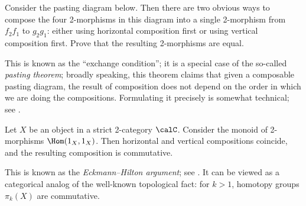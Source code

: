 \begin{exercise}\label{ec:exchange_condition}
  Consider the pasting diagram below. Then there are two obvious ways to
  compose the four 2-morphisms in this diagram into a single 2-morphism from
  $f_2f_1$ to $g_2g_1$: either using horizontal composition first or using
  vertical composition first. Prove that the resulting 2-morphisms are equal.

  \begin{figure}[h]
  \end{figure}
  This is known as the ``exchange condition''; it is a special case of the
  so-called \emph{pasting theorem}; broadly speaking, this theorem claims that given a
  composable pasting diagram, the result of composition does not depend on the order
  in which we are doing the compositions. Formulating it precisely is somewhat
  technical; see \cite{power-pasting}.
\end{exercise}
\begin{lemma}\label{l:eckmann-hilton}
  Let $X$ be an object in a strict 2-category $\calC$. Consider the monoid of
  2-morphisms $\Hom(1_X, 1_X)$. Then horizontal and vertical compositions
  coincide, and the resulting composition is commutative.
\end{lemma}
This is known as the \emph{Eckmann--Hilton argument}; see
\cite[Lemma 1.2.4]{leinster}. It can be viewed as a categorical analog of
the well-known topological fact: for $k>1$, homotopy groups $\pi_k(X)$
are commutative.

